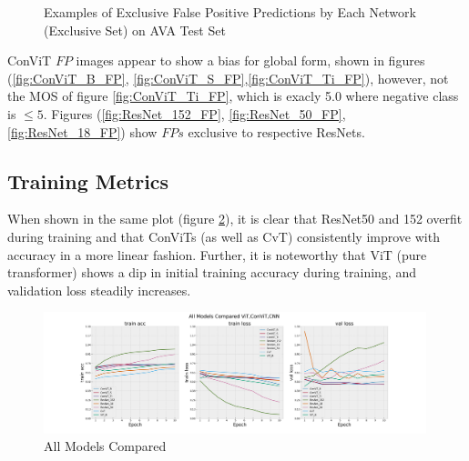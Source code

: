 \begin{figure}[ht!]
    \caption{Examples of Exclusive False Positive Predictions by Each Network (Exclusive Set) on AVA Test Set}
    \label{fig:true_positive}
\end{figure}

ConViT $FP$ images appear to show a bias for global form, shown in figures (\ref{fig:ConViT_B_FP}, \ref{fig:ConViT_S_FP},\ref{fig:ConViT_Ti_FP}), however, not the MOS of figure \ref{fig:ConViT_Ti_FP}, which is exacly 5.0 where negative class is $\leq 5$. Figures (\ref{fig:ResNet_152_FP}, \ref{fig:ResNet_50_FP}, \ref{fig:ResNet_18_FP}) show $FPs$ exclusive to respective ResNets. 

\subsection{Training Metrics}

When shown in the same plot (figure \ref{fig:all models}), it is clear that ResNet50 and 152 overfit during training and that ConViTs (as well as CvT) consistently improve with accuracy in a more linear fashion. Further, it is noteworthy that ViT (pure transformer) shows a dip in initial training accuracy during training, and validation loss steadily increases.

\begin{figure}[ht]
    \centering
    \includegraphics[width=0.99\textwidth]{figures/results_and_discussion/All Models Compared ViT,ConViT,CNN .png}
    \caption{All Models Compared}
    \label{fig:all models}
\end{figure}


